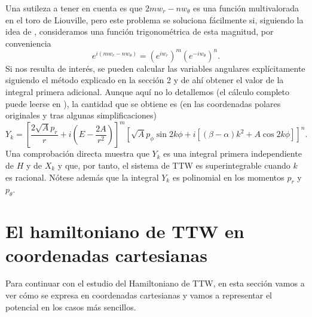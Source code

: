 \documentclass[12pt,a4paper,twoside]{article}
\theoremstyle{definition} \newtheorem{defn}[thm]{Definición}
\theoremstyle{definition} \newtheorem{ejemplo}[thm]{Ejemplo}
\theoremstyle{definition} \newtheorem{ejercicio}[thm]{Ejercicio}
\theoremstyle{remark} \newtheorem*{obs}{Observación}
\begin{document}
Una sutileza a tener en cuenta es que $2mw_r-nw_\theta$ es una función multivalorada en el toro de Liouville, pero este problema se soluciona fácilmente si, siguiendo la idea de \cite{landau}, consideramos una función trigonométrica de esta magnitud, por conveniencia
\begin{equation}
  e^{i(mw_r-nw_{\theta})}=(e^{iw_r})^{m}(e^{-iw_{\theta}})^n.
\end{equation}
Si nos resulta de interés, se pueden calcular las variables angulares explícitamente siguiendo el método explicado en la sección 2 y de ahí obtener el valor de la integral primera adicional. Aunque aquí no lo detallemos (el cálculo completo puede leerse en \cite{gonera}), la cantidad que se obtiene es (en las coordenadas polares originales y tras algunas simplificaciones)
\begin{equation}
  Y_{k}=\left[ \frac{2\sqrt{A}p_r}{r}+i\left( E-\frac{2A}{r^2} \right) \right]^m\left[\sqrt{A}p_{\phi}\sin 2k\phi + i\left[ (\beta-\alpha)k^2+A\cos2k\phi \right] \right]^n.
\end{equation}
Una comprobación directa muestra que $Y_{k}$ es una integral primera independiente de $H$ y de $X_k$ y que, por tanto, el sistema de TTW es superintegrable cuando $k$ es racional. Nótese además que la integral $Y_k$ es polinomial en los momentos $p_r$ y $p_\theta$.

\section{El hamiltoniano de TTW en coordenadas cartesianas}
Para continuar con el estudio del Hamiltoniano de TTW, en esta sección vamos a ver cómo se expresa en coordenadas cartesianas y vamos a representar el potencial en los casos más sencillos.
\end{document}
